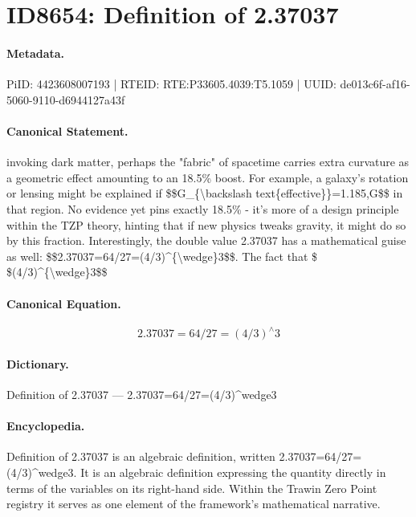 \section*{ID8654: Definition of 2.37037}
\paragraph{Metadata.}
PiID: 4423608007193 | RTEID: RTE:P33605.4039:T5.1059 | UUID: de013c6f-af16-5060-9110-d6944127a43f

\paragraph{Canonical Statement.}
invoking dark matter, perhaps the "fabric" of spacetime carries extra curvature as a geometric effect amounting to an 18.5\% boost. For example, a galaxy's rotation or lensing might be explained if \$\$G\_\{\textbackslash{}backslash text\{effective\}\}=1.185,G\$\$ in that region. No evidence yet pins exactly 18.5\% - it's more of a design principle within the TZP theory, hinting that if new physics tweaks gravity, it might do so by this fraction. Interestingly, the double value 2.37037 has a mathematical guise as well: \$\$2.37037=64/27=(4/3)\textasciicircum{}\{\textbackslash{}wedge\}3\$\$. The fact that \$ \$(4/3)\textasciicircum{}\{\textbackslash{}wedge\}3\$\$

\paragraph{Canonical Equation.}
\[
2.37037=64/27=(4/3)^{\wedge}3
\]

\paragraph{Dictionary.}
Definition of 2.37037 — 2.37037=64/27=(4/3)\textasciicircum{}wedge3

\paragraph{Encyclopedia.}
Definition of 2.37037 is an algebraic definition, written 2.37037=64/27=(4/3)\textasciicircum{}wedge3. It is an algebraic definition expressing the quantity directly in terms of the variables on its right-hand side. Within the Trawin Zero Point registry it serves as one element of the framework's mathematical narrative.
